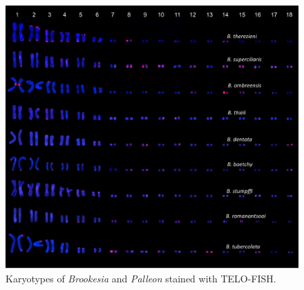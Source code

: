 \documentclass[a4paper, 12pt]{article}
\begin{document}
\newpage
\begin{figure}[H]
 \centering
  \includegraphics[width = \linewidth]{figures/marcello-s2.jpg}
  \caption{Karyotypes of \textit{Brookesia} and \textit{Palleon} stained with TELO-FISH.
}
  \label{fig-s2}
\end{figure}
\end{document}
